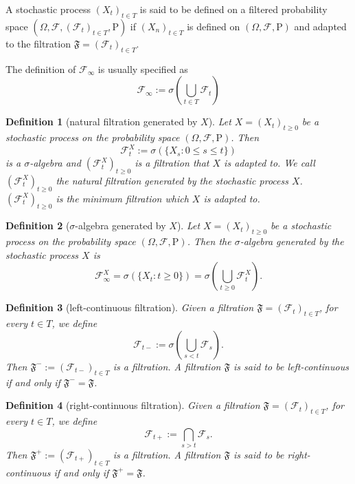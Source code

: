 \documentclass{report}
\newtheorem{definition}{Definition}[section]
\theoremstyle{nonumberplain}
\begin{document}
A stochastic process $(X_{t})_{t\in T }$ is said to be defined on a filtered probability space $(\Omega,\mathcal{F},(\mathcal{F}_{t})_{t\in T },\mathrm{P})$ if $(X_{n})_{t\in T }$ is defined on $(\Omega,\mathcal{F},\mathrm{P})$ and adapted to the filtration $\mathfrak{F} =(\mathcal{F}_{t})_{t\in T }$. 

The definition of $\mathcal{F}_{\infty}$ is usually specified as
\[
\mathcal{F}_{\infty}:=\sigma\left(\bigcup_{t\in T} \mathcal{F}_t\right)
\]

\begin{definition}[natural filtration generated by $X$]
	Let $X=(X_{t})_{t\ge 0}$ be a stochastic process on the probability space $(\Omega,\mathcal{F},\mathrm{P})$. Then 
	\[
	{\mathcal {F}}_{t}^X:=\sigma (\{X_{s}:0\le s\le t\})
	\]
	is a $\sigma$-algebra and $(\mathcal {F}_{t}^X)_{t\ge0} $ is a filtration that $X$ is adapted to. We call $(\mathcal {F}_{t}^X)_{t\ge0} $ the \emph{natural filtration generated by the stochastic process $X$}. $(\mathcal {F}_{t}^X)_{t\ge0} $ is the minimum filtration which $X$ is adapted to.
\end{definition}

\begin{definition}[$\sigma$-algebra generated by $X$]
	Let $X=(X_{t})_{t\ge 0}$ be a stochastic process on the probability space $(\Omega,\mathcal{F},\mathrm{P})$. Then the \emph{$\sigma$-algebra generated by the stochastic process $X$} is
	\[
	{\mathcal {F}}_{\infty}^X=\sigma (\{X_{t}:t\ge 0\})=\sigma\left(\bigcup_{t\ge 0} \mathcal{F}^X_t\right).
	\]
\end{definition}

\begin{definition}[left-continuous filtration]
	Given a filtration $\mathfrak{F}=(\mathcal{F}_{t})_{t\in T}$, for every $t\in T$, we define
	\[
	\mathcal{F}_{t-}:=\sigma\left(\bigcup_{s<t}\mathcal{F}_{s}\right).
	\]
	Then $\mathfrak{F}^-:=({\mathcal{F}}_{t-})_{t\in T}$ is a filtration. A filtration $\mathfrak{F}$ is said to be \emph{left-continuous} if and only if $\mathfrak{F}^{-}=\mathfrak{F}$.
\end{definition}
\begin{definition}[right-continuous filtration]
	Given a filtration $\mathfrak{F}=(\mathcal{F}_{t})_{t\in T}$, for every $t\in T$, we define
	\[
	\mathcal{F}_{t+}:=\bigcap_{s>t}\mathcal{F}_{s}.
	\]
	Then $\mathfrak{F}^+:=({\mathcal{F}}_{t+})_{t\in T}$ is a filtration. A filtration $\mathfrak{F}$ is said to be \emph{right-continuous} if and only if $\mathfrak{F}^{+}=\mathfrak{F}$.
\end{definition}
\end{document}
